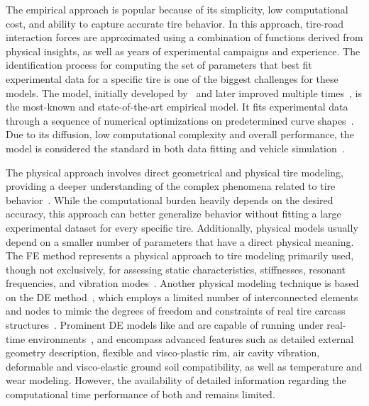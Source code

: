 The empirical approach is popular because of its simplicity, low computational cost, and ability to capture accurate tire behavior. In this approach, tire-road interaction forces are approximated using a combination of functions derived from physical insights, as well as years of experimental campaigns and experience. The identification process for computing the set of parameters that best fit experimental data for a specific tire is one of the biggest challenges for these models. The \MagicFormulae{} model, initially developed by~\citet{bakker1987tyre} and later improved multiple times~\cite{pacejka2012tire}, is the most-known and state-of-the-art empirical model. It fits experimental data through a sequence of numerical optimizations on predetermined curve shapes~\cite{bayle1993new}. Due to its diffusion, low computational complexity and overall performance, the \MagicFormulae{} model is considered the standard in both data fitting and vehicle simulation~\cite{guiggiani2014science, pacejka2012tire}.

The physical approach involves direct geometrical and physical tire modeling, providing a deeper understanding of the complex phenomena related to tire behavior~\cite{nakajima2019advanced}. While the computational burden heavily depends on the desired accuracy, this approach can better generalize behavior without fitting a large experimental dataset for every specific tire. Additionally, physical models usually depend on a smaller number of parameters that have a direct physical meaning. The \ac{FE} method represents a physical approach to tire modeling primarily used, though not exclusively, for assessing static characteristics, stiffnesses, resonant frequencies, and vibration modes~\cite{taheri2014technical}. Another physical modeling technique is based on the \ac{DE} method~\cite{karpman2020discrete}, which employs a limited number of interconnected elements and nodes to mimic the degrees of freedom and constraints of real tire carcass structures~\cite{gipser2005ftire, gallrein2007cdtire, yamashita2016physicsbased}. Prominent \ac{DE} models like \FTire{} and \CDTire{} are capable of running under real-time environments~\cite{cosinscientific, gallrein2014advanced}, and encompass advanced features such as detailed external geometry description, flexible and visco-plastic rim, air cavity vibration, deformable and visco-elastic ground soil compatibility, as well as temperature and wear modeling. However, the availability of detailed information regarding the computational time performance of both \FTire{} and \CDTire{} remains limited.

